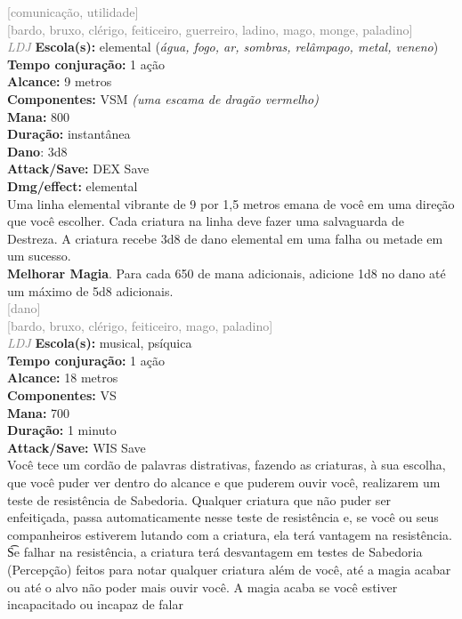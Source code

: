 \documentclass{RPG_Adventure}[2021/10/20]
\begin{document}
{\scriptsize \textcolor{gray}{[comunicação, utilidade]\\}}
{\scriptsize \textcolor{gray}{[bardo, bruxo, clérigo, feiticeiro, guerreiro, ladino, mago, monge, paladino]\\}}
{\tiny \textcolor{gray}{\textit{LDJ}}}
{\small \t \textbf{Escola(s):} elemental (\textit{água, fogo, ar, sombras, relâmpago, metal, veneno})\\\t \textbf{Tempo conjuração:} 1 ação\\\t \textbf{Alcance:} 9 metros\\\t \textbf{Componentes:} VSM \textit{(uma escama de dragão vermelho)}\\\t \textbf{Mana:} 800\\\t \textbf{Duração:} instantânea\\\t \textbf{Dano}: 3d8\\\t \textbf{Attack/Save:} DEX Save\\\t \textbf{Dmg/effect:} elemental\\}
{\normalsize Uma linha elemental vibrante de 9 por 1,5 metros emana de você em uma direção que você escolher. Cada criatura na linha deve fazer uma salvaguarda de Destreza. A criatura recebe 3d8 de dano elemental em uma falha ou metade em um sucesso.\\\t \textbf{Melhorar Magia}. Para cada 650 de mana adicionais, adicione 1d8 no dano até um máximo de 5d8 adicionais.\\}
{\scriptsize \textcolor{gray}{[dano]\\}}
{\scriptsize \textcolor{gray}{[bardo, bruxo, clérigo, feiticeiro, mago, paladino]\\}}
{\tiny \textcolor{gray}{\textit{LDJ}}}
{\small \t \textbf{Escola(s):} musical, psíquica\\\t \textbf{Tempo conjuração:} 1 ação\\\t \textbf{Alcance:} 18 metros\\\t \textbf{Componentes:} VS\\\t \textbf{Mana:} 700\\\t \textbf{Duração:} 1 minuto\\\t \textbf{Attack/Save:} WIS Save\\}
{\normalsize Você tece um cordão de palavras distrativas, fazendo as criaturas, à sua escolha, que você puder ver dentro do alcance e que puderem ouvir você, realizarem um teste de resistência de Sabedoria. Qualquer criatura que não puder ser enfeitiçada, passa automaticamente nesse teste de resistência e, se você ou seus companheiros estiverem lutando com a criatura, ela terá vantagem na resistência.\\\t Se falhar na resistência, a criatura terá desvantagem em testes de Sabedoria (Percepção) feitos para notar qualquer criatura além de você, até a magia acabar ou até o alvo não poder mais ouvir você. A magia acaba se você estiver incapacitado ou incapaz de falar\\}
\end{document}
